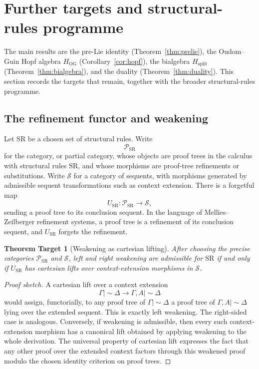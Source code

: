\documentclass[11pt]{article}
\newtheorem{target}[theorem]{Theorem Target}
\newcommand{\ms}{\mathrel{\mid\!\sim}}
\begin{document}
\section{Further targets and structural-rules programme}

The main results are the pre-Lie identity (Theorem~\ref{thm:prelie}), the Oudom--Guin Hopf algebra $H_{\mathrm{OG}}$ (Corollary~\ref{cor:hopf}), the bialgebra $H_{\mathrm{split}}$ (Theorem~\ref{thm:bialgebra}), and the duality (Theorem~\ref{thm:duality}).  This section records the targets that remain, together with the broader structural-rules programme.

\subsection{The refinement functor and weakening}

Let \(\mathrm{SR}\) be a chosen set of structural rules.  Write
\[
\mathcal P_{\mathrm{SR}}
\]
for the category, or partial category, whose objects are proof trees in the
calculus with structural rules \(\mathrm{SR}\), and whose morphisms are
proof-tree refinements or substitutions.  Write \(\mathcal S\) for a category
of sequents, with morphisms generated by admissible sequent transformations
such as context extension.  There is a forgetful map
\[
U_{\mathrm{SR}}:\mathcal P_{\mathrm{SR}}\longrightarrow \mathcal S,
\]
sending a proof tree to its conclusion sequent.  In the language of
Mellies--Zeilberger refinement systems, a proof tree is a refinement of its
conclusion sequent, and \(U_{\mathrm{SR}}\) forgets the refinement.

\begin{target}[Weakening as cartesian lifting]
After choosing the precise categories \(\mathcal P_{\mathrm{SR}}\) and
\(\mathcal S\), left and right weakening are admissible for
\(\mathrm{SR}\) if and only if \(U_{\mathrm{SR}}\) has cartesian lifts over
context-extension morphisms in \(\mathcal S\).
\end{target}

\begin{proof}[Proof sketch]
A cartesian lift over a context extension
\[
\Gamma\ms\Delta\longrightarrow \Gamma,A\ms\Delta
\]
would assign, functorially, to any proof tree of \(\Gamma\ms\Delta\) a proof
tree of \(\Gamma,A\ms\Delta\) lying over the extended sequent.  This is exactly
left weakening.  The right-sided case is analogous.  Conversely, if weakening
is admissible, then every such context-extension morphism has a canonical
lift obtained by applying weakening to the whole derivation.  The universal
property of cartesian lift expresses the fact that any other proof over the
extended context factors through this weakened proof modulo the chosen
identity criterion on proof trees.
\end{proof}
\end{document}
